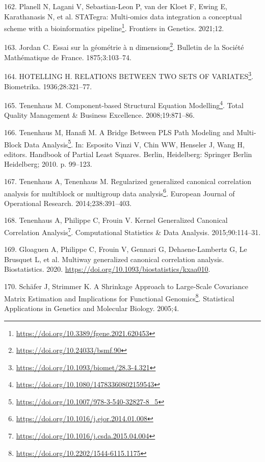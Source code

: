 \documentclass[
  a4paper,
]{book}
\DeclareRobustCommand{\href}[2]{#2\footnote{\url{#1}}}
\newlength{\cslhangindent}
\newlength{\cslentryspacingunit} %
\newenvironment{CSLReferences}[2] %
 {%
  \setlength{\parindent}{0pt}
  \ifodd #1
  \let\oldpar\par
  \def\par{\hangindent=\cslhangindent\oldpar}
  \fi
  \setlength{\parskip}{#2\cslentryspacingunit}
 }%
 {}
\begin{document}
\begin{CSLReferences}{0}{0}
\leavevmode{}%
162. Planell N, Lagani V, Sebastian-Leon P, van der Kloet F, Ewing E, Karathanasis N, et al. \href{https://doi.org/10.3389/fgene.2021.620453}{STATegra: Multi-omics data integration {\textendash} a conceptual scheme with a bioinformatics pipeline}. Frontiers in Genetics. 2021;12.

\leavevmode{}%
163. Jordan C. \href{https://doi.org/10.24033/bsmf.90}{Essai sur la géométrie à n dimensions}. Bulletin de la Société Mathématique de France. 1875;3:103--74.

\leavevmode{}%
164. HOTELLING H. \href{https://doi.org/10.1093/biomet/28.3-4.321}{RELATIONS BETWEEN TWO SETS OF VARIATES}. Biometrika. 1936;28:321--77.

\leavevmode{}%
165. Tenenhaus M. \href{https://doi.org/10.1080/14783360802159543}{Component-based {Structural Equation Modelling}}. Total Quality Management \& Business Excellence. 2008;19:871--86.

\leavevmode{}%
166. Tenenhaus M, Hanafi M. \href{https://doi.org/10.1007/978-3-540-32827-8_5}{A {Bridge Between PLS Path Modeling} and {Multi}-{Block Data Analysis}}. In: Esposito Vinzi V, Chin WW, Henseler J, Wang H, editors. Handbook of {Partial Least Squares}. Berlin, Heidelberg: {Springer Berlin Heidelberg}; 2010. p. 99--123.

\leavevmode{}%
167. Tenenhaus A, Tenenhaus M. \href{https://doi.org/10.1016/j.ejor.2014.01.008}{Regularized generalized canonical correlation analysis for multiblock or multigroup data analysis}. European Journal of Operational Research. 2014;238:391--403.

\leavevmode{}%
168. Tenenhaus A, Philippe C, Frouin V. \href{https://doi.org/10.1016/j.csda.2015.04.004}{Kernel {Generalized Canonical Correlation Analysis}}. Computational Statistics \& Data Analysis. 2015;90:114--31.

\leavevmode{}%
169. Gloaguen A, Philippe C, Frouin V, Gennari G, Dehaene-Lambertz G, Le Brusquet L, et al. Multiway generalized canonical correlation analysis. Biostatistics. 2020. \url{https://doi.org/10.1093/biostatistics/kxaa010}.

\leavevmode{}%
170. Schäfer J, Strimmer K. \href{https://doi.org/10.2202/1544-6115.1175}{A Shrinkage Approach to Large-Scale Covariance Matrix Estimation and Implications for Functional Genomics}. Statistical Applications in Genetics and Molecular Biology. 2005;4.


\end{CSLReferences}
\end{document}

